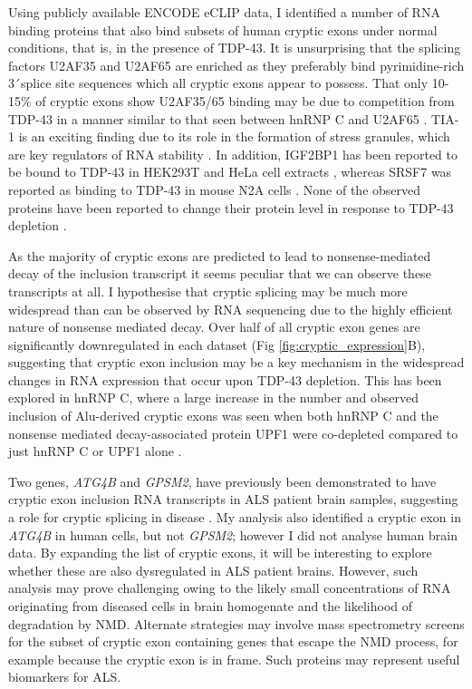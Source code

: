 Using publicly available ENCODE eCLIP data, I identified a number of RNA binding proteins that also bind subsets of human cryptic exons under normal conditions, that is, in the presence of TDP-43.  It is unsurprising that the splicing factors U2AF35 and U2AF65 are enriched as they preferably bind pyrimidine-rich 3\'\ splice site sequences which all cryptic exons appear to possess. That only 10-15\% of cryptic exons show U2AF35/65 binding may be due to competition from TDP-43 in a manner similar to that seen between hnRNP C and U2AF65 \citep{Zarnack2013-nv}. TIA-1 is an exciting finding due to its role in the formation of stress granules, which are key regulators of RNA stability \citep{gilks2004stress}. In addition, IGF2BP1 has been reported to be bound to TDP-43 in HEK293T and HeLa cell extracts \citep{Ling2010-sr,Freibaum2010-hw}, whereas SRSF7 was reported as binding to TDP-43 in mouse N2A cells \citep{Blokhuis2016-hw}. None of the observed proteins have been reported to change their protein level in response to TDP-43 depletion \citep{Stalekar2015-qd}.

As the majority of cryptic exons are predicted to lead to nonsense-mediated decay of the inclusion transcript it seems peculiar that we can observe these transcripts at all. I hypothesise that cryptic splicing may be much more widespread than can be observed by RNA sequencing due to the highly efficient nature of nonsense mediated decay. Over half of all cryptic exon genes are significantly downregulated in each dataset (Fig \ref{fig:cryptic_expression}B), suggesting that cryptic exon inclusion may be a key mechanism in the widespread changes in RNA expression that occur upon TDP-43 depletion. This has been explored in hnRNP C, where a large increase in the number and observed inclusion of Alu-derived cryptic exons was seen when both hnRNP C and the nonsense mediated decay-associated protein UPF1 were co-depleted compared to just hnRNP C or UPF1 alone \citep{Attig2016}.

Two genes, \emph{ATG4B} and \emph{GPSM2}, have previously been demonstrated to have cryptic exon inclusion RNA transcripts in ALS patient brain samples, suggesting a role for cryptic splicing in disease \citep{Ling2015}. My analysis also identified a cryptic exon in \emph{ATG4B} in human cells, but not \emph{GPSM2}; however I did not analyse human brain data. By expanding the list of cryptic exons, it will be interesting to explore whether these are also dysregulated in ALS patient brains. However, such analysis may prove challenging owing to the likely small concentrations of RNA originating from diseased cells in brain homogenate and the likelihood of degradation by NMD. Alternate strategies may involve mass spectrometry screens for the subset of cryptic exon containing genes that escape the NMD process, for example because the cryptic exon is in frame. Such proteins may represent useful biomarkers for ALS. 

